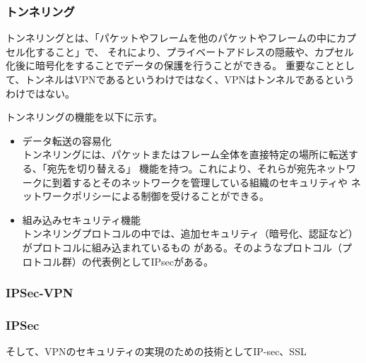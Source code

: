 \documentclass[12pt,a4paper,titlepage]{jsarticle}
\begin{document}
\subsubsection*{トンネリング}
トンネリングとは、「パケットやフレームを他のパケットやフレームの中にカプセル化すること」で、
それにより、プライベートアドレスの隠蔽や、カプセル化後に暗号化をすることでデータの保護を行うことができる。
重要なこととして、トンネルはVPNであるというわけではなく、VPNはトンネルであるという
わけではない。
\par トンネリングの機能を以下に示す。
\begin{itemize}
    \item データ転送の容易化 \mbox{}\\
    トンネリングには、パケットまたはフレーム全体を直接特定の場所に転送する、「宛先を切り替える」
    機能を持つ。これにより、それらが宛先ネットワークに到着するとそのネットワークを管理している組織のセキュリティや
    ネットワークポリシーによる制御を受けることができる。
    \item 組み込みセキュリティ機能\mbox{}\\
    トンネリングプロトコルの中では、追加セキュリティ（暗号化、認証など）がプロトコルに組み込まれているもの
    がある。そのようなプロトコル（プロトコル群）の代表例としてIPsecがある。
\end{itemize}

\subsubsection*{IPSec-VPN}

\subsubsection*{IPSec}




そして、VPNのセキュリティの実現のための技術としてIP-sec、SSL









\end{document}
